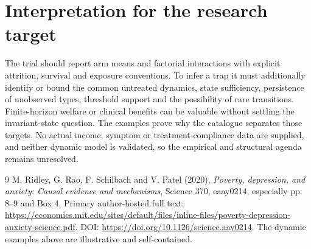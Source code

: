 \documentclass[11pt,a4paper]{article}
\begin{document}
\section{Interpretation for the research target}
The trial should report arm means and factorial interactions with explicit attrition, survival and exposure conventions. To infer a trap it must additionally identify or bound the common untreated dynamics, state sufficiency, persistence of unobserved types, threshold support and the possibility of rare transitions. Finite-horizon welfare or clinical benefits can be valuable without settling the invariant-state question. The examples prove why the catalogue separates those targets. No actual income, symptom or treatment-compliance data are supplied, and neither dynamic model is validated, so the empirical and structural agenda remains unresolved.

\begin{thebibliography}{9}
 M. Ridley, G. Rao, F. Schilbach and V. Patel (2020), \emph{Poverty, depression, and anxiety: Causal evidence and mechanisms}, Science 370, eaay0214, especially pp. 8--9 and Box 4. Primary author-hosted full text: \url{https://economics.mit.edu/sites/default/files/inline-files/poverty-depression-anxiety-science.pdf}. DOI: \url{https://doi.org/10.1126/science.aay0214}. The dynamic examples above are illustrative and self-contained.
\end{thebibliography}
\end{document}

